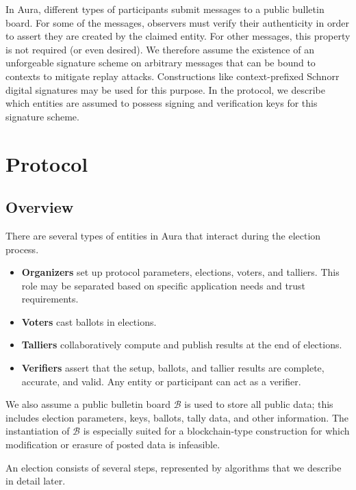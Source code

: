 \documentclass{article}
\begin{document}
In Aura, different types of participants submit messages to a public bulletin board.
For some of the messages, observers must verify their authenticity in order to assert they are created by the claimed entity.
For other messages, this property is not required (or even desired).
We therefore assume the existence of an unforgeable signature scheme on arbitrary messages that can be bound to contexts to mitigate replay attacks.
Constructions like context-prefixed Schnorr digital signatures may be used for this purpose.
In the protocol, we describe which entities are assumed to possess signing and verification keys for this signature scheme.


\section{Protocol}


\subsection{Overview}

There are several types of entities in Aura that interact during the election process.

\begin{itemize}
	\item \textbf{Organizers} set up protocol parameters, elections, voters, and talliers.
	This role may be separated based on specific application needs and trust requirements.
	\item \textbf{Voters} cast ballots in elections.
	\item \textbf{Talliers} collaboratively compute and publish results at the end of elections.
	\item \textbf{Verifiers} assert that the setup, ballots, and tallier results are complete, accurate, and valid.
	Any entity or participant can act as a verifier.
\end{itemize}
We also assume a public bulletin board $\mathcal{B}$ is used to store all public data; this includes election parameters, keys, ballots, tally data, and other information.
The instantiation of $\mathcal{B}$ is especially suited for a blockchain-type construction for which modification or erasure of posted data is infeasible.

An election consists of several steps, represented by algorithms that we describe in detail later.
\end{document}
